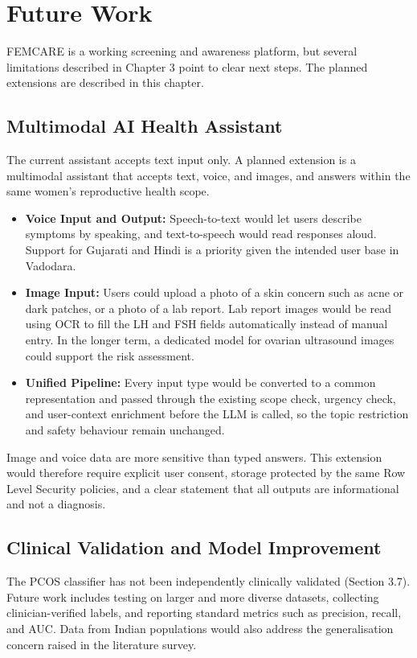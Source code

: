 \chapter{Future Work}
FEMCARE is a working screening and awareness platform, but several limitations described in Chapter 3 point to clear next steps. The planned extensions are described in this chapter.

\section{Multimodal AI Health Assistant}

The current assistant accepts text input only. A planned extension is a multimodal assistant that accepts text, voice, and images, and answers within the same women's reproductive health scope.

\begin{itemize}
    \item \textbf{Voice Input and Output:} Speech-to-text would let users describe symptoms by speaking, and text-to-speech would read responses aloud. Support for Gujarati and Hindi is a priority given the intended user base in Vadodara.
    \item \textbf{Image Input:} Users could upload a photo of a skin concern such as acne or dark patches, or a photo of a lab report. Lab report images would be read using OCR to fill the LH and FSH fields automatically instead of manual entry. In the longer term, a dedicated model for ovarian ultrasound images could support the risk assessment.
    \item \textbf{Unified Pipeline:} Every input type would be converted to a common representation and passed through the existing scope check, urgency check, and user-context enrichment before the LLM is called, so the topic restriction and safety behaviour remain unchanged.
\end{itemize}

Image and voice data are more sensitive than typed answers. This extension would therefore require explicit user consent, storage protected by the same Row Level Security policies, and a clear statement that all outputs are informational and not a diagnosis.

\section{Clinical Validation and Model Improvement}

The PCOS classifier has not been independently clinically validated (Section 3.7). Future work includes testing on larger and more diverse datasets, collecting clinician-verified labels, and reporting standard metrics such as precision, recall, and AUC. Data from Indian populations would also address the generalisation concern raised in the literature survey.

